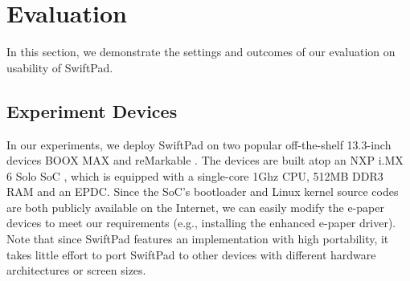 \documentclass[]{sigchi}
\begin{document}








\section{Evaluation}\label{sect:eve}
In this section, we demonstrate the settings and outcomes of our evaluation on usability of SwiftPad. 

\subsection{Experiment Devices}
In our experiments, we deploy SwiftPad on two popular off-the-shelf 13.3-inch devices BOOX MAX \cite{onyxboox} and reMarkable \cite{reMarkable}. 
The devices are built atop an NXP i.MX 6 Solo SoC \cite{nxpsoc}, which is equipped with a single-core 1Ghz CPU, 512MB DDR3 RAM and an EPDC. Since the SoC's bootloader and Linux kernel source codes are both publicly available on the Internet, we can easily modify the e-paper devices to meet our requirements (e.g., installing the enhanced e-paper driver). 
Note that since SwiftPad features an implementation with high portability, it takes little effort to port SwiftPad to other devices with different hardware architectures or screen sizes. 

\end{document}
